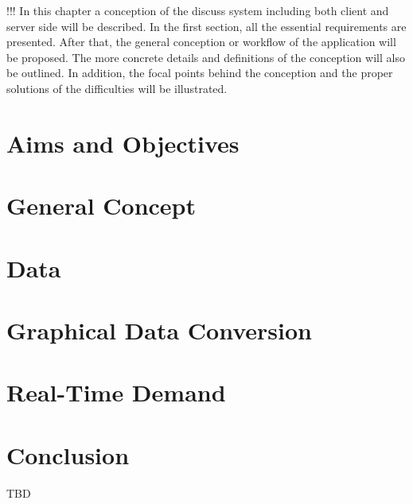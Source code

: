 !!! In this chapter a conception of the discuss system including both client and server side will be described. In the first section, all the essential requirements are presented. After that, the general conception or workflow of the application will be proposed. The more concrete details and definitions of the conception will also be outlined. In addition, the focal points behind the conception and the proper solutions of the difficulties will be illustrated.


\section{Aims and Objectives}\label{sec:aims}

\section{General Concept}

\section{Data}
\label{sec:data-concept}
\section{Graphical Data Conversion}

\section{Real-Time Demand}


% 

\section{Conclusion}
TBD